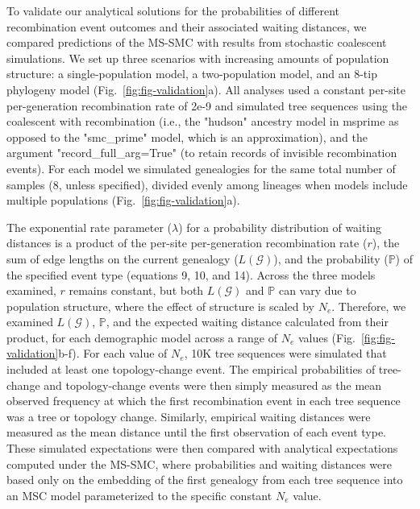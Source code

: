 \documentclass[11pt]{article}
\begin{document}
To validate our analytical solutions for the probabilities of different 
recombination event outcomes and their associated waiting distances, 
we compared predictions of the MS-SMC with results from stochastic 
coalescent simulations. 
We set up three scenarios with increasing amounts of population structure: 
a single-population model, a two-population model, and an 8-tip phylogeny model
(Fig.~\ref{fig:fig-validation}a). 
All analyses used a constant per-site per-generation recombination rate of 
2e-9 and simulated tree sequences using the coalescent with recombination 
(i.e., the "hudson" ancestry model in msprime as opposed to the "smc\_prime" model, 
which is an approximation), %
and the argument 
"record\_full\_arg=True" (to retain records of invisible recombination events). 
For each model we simulated genealogies for the same total number of samples
(8, unless specified), divided evenly among lineages when models 
include multiple populations (Fig.~\ref{fig:fig-validation}a). 

The exponential rate parameter ($\lambda$) for a probability distribution of waiting distances 
is a product of the per-site per-generation recombination rate ($r$), the sum 
of edge lengths on the current genealogy ($L(\mathcal{G})$), and the probability 
($\mathbb{P}$) of the specified event type (equations 9, 10, and 14). 
Across the three models examined, $r$ remains constant, but both $L(\mathcal{G})$ 
and $\mathbb{P}$ can vary due to population structure, where the effect of 
structure is scaled by $N_e$. 
Therefore, we examined $L(\mathcal{G})$, $\mathbb{P}$, and the expected waiting 
distance calculated from their product, for each demographic model across a range 
of $N_e$ values (Fig.~\ref{fig:fig-validation}b-f). 
For each value of $N_e$, 10K tree sequences were simulated that included at least 
one topology-change event. The empirical probabilities of tree-change and 
topology-change events were then simply measured %
as the mean observed frequency at which the first recombination event in each 
tree sequence was a tree or topology change. Similarly, empirical waiting 
distances were measured as the mean distance until the first observation of 
each event type. These simulated expectations were then compared with analytical
expectations computed under the MS-SMC, where probabilities and waiting distances 
were based only on the embedding of the first genealogy from each tree sequence 
into an MSC model parameterized to the specific constant $N_e$ value. 
\end{document}
